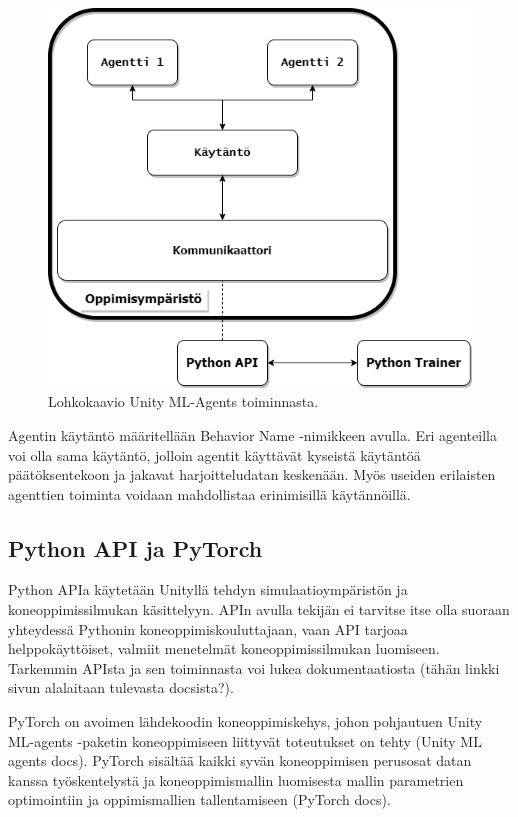 \documentclass[utf8]{gradu3}
\begin{document}
\begin{figure}[h]
\centering
\includegraphics[width=15cm]{mlagents_structure.png}
\caption{Lohkokaavio Unity ML-Agents toiminnasta.}
\label{mlagentsstructure}
\end{figure}

Agentin käytäntö määritellään Behavior Name -nimikkeen avulla. Eri agenteilla voi olla sama käytäntö, jolloin agentit käyttävät kyseistä käytäntöä päätöksentekoon ja jakavat harjoitteludatan keskenään. Myös useiden erilaisten agenttien toiminta voidaan mahdollistaa erinimisillä käytännöillä.

\subsection{Python API ja PyTorch}

Python APIa käytetään Unityllä tehdyn simulaatioympäristön ja koneoppimissilmukan käsittelyyn. APIn avulla tekijän ei tarvitse itse olla suoraan yhteydessä Pythonin koneoppimiskouluttajaan, vaan API tarjoaa helppokäyttöiset, valmiit menetelmät koneoppimissilmukan luomiseen. Tarkemmin APIsta ja sen toiminnasta voi lukea dokumentaatiosta (tähän linkki sivun alalaitaan tulevasta docsista?).

PyTorch on avoimen lähdekoodin koneoppimiskehys, johon pohjautuen Unity ML-agents -paketin koneoppimiseen liittyvät toteutukset on tehty (Unity ML agents docs). PyTorch sisältää kaikki syvän koneoppimisen perusosat datan kanssa työskentelystä ja koneoppimismallin luomisesta mallin parametrien optimointiin ja oppimismallien tallentamiseen (PyTorch docs).
\end{document}
